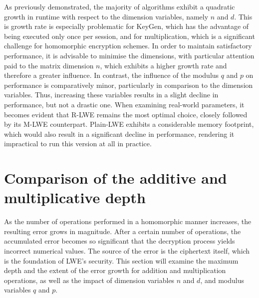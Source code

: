 As previously demonstrated, the majority of algorithms exhibit a quadratic growth in runtime with respect to the dimension variables, namely $n$ and $d$. This is growth rate is especially problematic for KeyGen, which has the advantage of being executed only once per session, and for multiplication, which is a significant challenge for homomorphic encryption schemes. In order to maintain satisfactory performance, it is advisable to minimise the dimensions, with particular attention paid to the matrix dimension $n$, which exhibits a higher growth rate and therefore a greater influence. In contrast, the influence of the modulus $q$ and $p$ on performance is comparatively minor, particularly in comparison to the dimension variables. Thus, increasing these variables results in a slight decline in performance, but not a drastic one. When examining real-world parameters, it becomes evident that R-LWE remains the most optimal choice, closely followed by its M-LWE counterpart. Plain-LWE exhibits a considerable memory footprint, which would also result in a significant decline in performance, rendering it impractical to run this version at all in practice.

\section{Comparison of the additive and multiplicative depth}

As the number of operations performed in a homomorphic manner increases, the resulting error grows in magnitude. After a certain number of operations, the accumulated error becomes so significant that the decryption process yields incorrect numerical values. The source of the error is the ciphertext itself, which is the foundation of LWE's security. This section will examine the maximum depth and the extent of the error growth for addition and multiplication operations, as well as the impact of dimension variables $n$ and $d$, and modulus variables $q$ and $p$.

